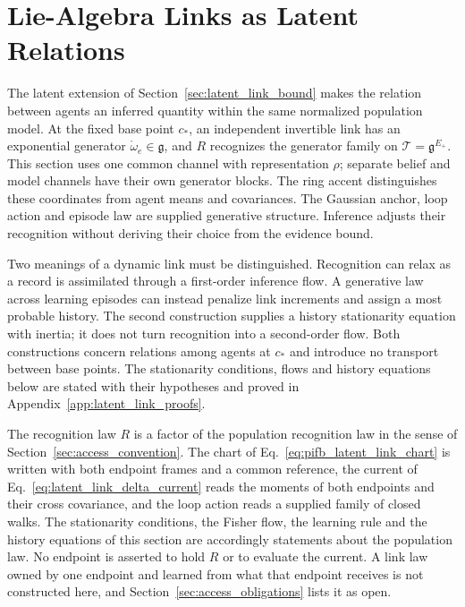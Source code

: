 \section{Lie-Algebra Links as Latent Relations}\label{sec:latent_lie_links}

The latent extension of Section~\ref{sec:latent_link_bound} makes the relation between agents an inferred quantity within the same normalized population model. At the fixed base point $c_*$, an independent invertible link has an exponential generator $\mathring\omega_e\in\mathfrak g$, and $R$ recognizes the generator family on $\mathcal T=\mathfrak g^{E_+}$. This section uses one common channel with representation $\rho$; separate belief and model channels have their own generator blocks. The ring accent distinguishes these coordinates from agent means and covariances. The Gaussian anchor, loop action and episode law are supplied generative structure. Inference adjusts their recognition without deriving their choice from the evidence bound.

Two meanings of a dynamic link must be distinguished. Recognition can relax as a record is assimilated through a first-order inference flow. A generative law across learning episodes can instead penalize link increments and assign a most probable history. The second construction supplies a history stationarity equation with inertia; it does not turn recognition into a second-order flow. Both constructions concern relations among agents at $c_*$ and introduce no transport between base points. The stationarity conditions, flows and history equations below are stated with their hypotheses and proved in Appendix~\ref{app:latent_link_proofs}.

The recognition law $R$ is a factor of the population recognition law in the sense of Section~\ref{sec:access_convention}. The chart of Eq.~\eqref{eq:pifb_latent_link_chart} is written with both endpoint frames and a common reference, the current of Eq.~\eqref{eq:latent_link_delta_current} reads the moments of both endpoints and their cross covariance, and the loop action reads a supplied family of closed walks. The stationarity conditions, the Fisher flow, the learning rule and the history equations of this section are accordingly statements about the population law. No endpoint is asserted to hold $R$ or to evaluate the current. A link law owned by one endpoint and learned from what that endpoint receives is not constructed here, and Section~\ref{sec:access_obligations} lists it as open.

